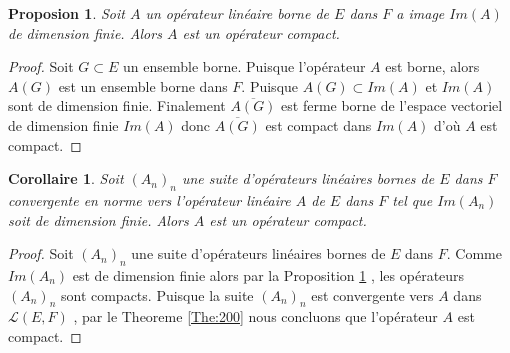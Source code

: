 \documentclass{report}
\newtheorem{Prop}{Proposion}[subsection]
\newtheorem{Cor}{Corollaire}[subsection]
\begin{document}
{\begin{Prop} \label{Prop:200} Soit $A$ un opérateur linéaire borne de $E$ dans $F$ a image $Im(A)$ de dimension finie. Alors $A$ est un opérateur compact.\\
\end{Prop}



\begin{proof}
Soit $G \subset E$ un ensemble borne. Puisque l'opérateur $A$ est borne, alors $A(G)$  est un ensemble borne dans $F$. Puisque $A(G) \subset Im(A)$ et $Im(A)$ sont de dimension finie. Finalement $\overline{A(G)}$ est ferme borne de l'espace vectoriel de dimension finie $Im(A)$ donc $\overline{A(G)}$ est compact dans $Im(A)$ d'où $A$ est compact. 
\end{proof}


\begin{Cor} Soit $(A_n)_n$ une suite d'opérateurs linéaires bornes de $E$ dans $F$ convergente en norme vers l'opérateur linéaire $A$ de $E$ dans $F$ tel que $Im(A_n)$ soit de dimension finie. Alors $A$ est un opérateur compact. \\
\end{Cor}
\begin{proof}
Soit $(A_n)_n$ une suite d'opérateurs linéaires bornes de $E$ dans $F$. Comme $Im(A_n)$ est de dimension finie alors par la Proposition \ref{Prop:200} , les opérateurs $(A_n)_n$ sont compacts. Puisque la suite $(A_n)_n$ est convergente vers $A$ dans $\mathscr{L}(E,F)$ , par le Theoreme \ref{The:200} nous concluons que l'opérateur $A$ est compact. 
\end{proof}


}
\end{document}
